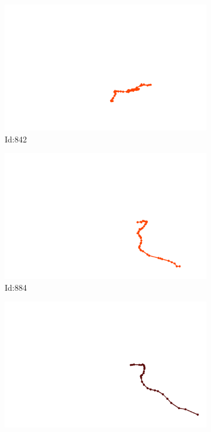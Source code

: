 \documentclass[12pt,twoside]{report}
\begin{document}
\begin{figure}
\begin{subfigure}[b]{0.20\textwidth}
\centering
\includegraphics[width=\textwidth]{../trajectories/842.png}
\caption{Id:842}
\end{subfigure}
\begin{subfigure}[b]{0.20\textwidth}
\centering
\includegraphics[width=\textwidth]{../trajectories/884.png}
\caption{Id:884}
\end{subfigure}
\begin{subfigure}[b]{0.20\textwidth}
\centering
\includegraphics[width=\textwidth]{../trajectories/890.png}

\end{subfigure}
\end{figure}
\end{document}
